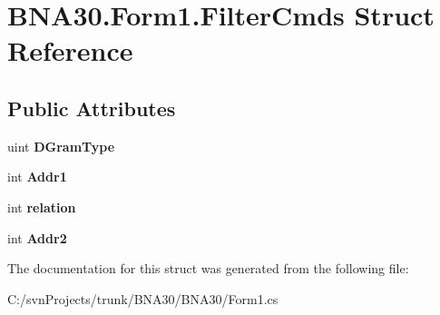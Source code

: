 \hypertarget{struct_b_n_a30_1_1_form1_1_1_filter_cmds}{}\section{B\+N\+A30.\+Form1.\+Filter\+Cmds Struct Reference}
\label{struct_b_n_a30_1_1_form1_1_1_filter_cmds}
\subsection*{Public Attributes}
\begin{DoxyCompactItemize}
\item 
\mbox{\label{struct_b_n_a30_1_1_form1_1_1_filter_cmds_a090e38004b29d207bd1830b97c7da3a8}} 
uint {\bfseries D\+Gram\+Type}
\item 
\mbox{\label{struct_b_n_a30_1_1_form1_1_1_filter_cmds_a8a908c596f85c7dbf4d8b0f74ab84d88}} 
int {\bfseries Addr1}
\item 
\mbox{\label{struct_b_n_a30_1_1_form1_1_1_filter_cmds_a068f25519188d73206eae0d347bbaa0a}} 
int {\bfseries relation}
\item 
\mbox{\label{struct_b_n_a30_1_1_form1_1_1_filter_cmds_a31bf4b2bd2e5ec281160d38819675feb}} 
int {\bfseries Addr2}
\end{DoxyCompactItemize}


The documentation for this struct was generated from the following file\+:\begin{DoxyCompactItemize}
\item 
C\+:/svn\+Projects/trunk/\+B\+N\+A30/\+B\+N\+A30/Form1.\+cs\end{DoxyCompactItemize}

